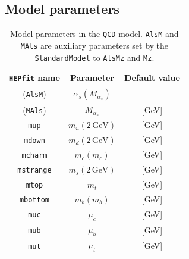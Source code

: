 \documentclass[preprint,3p,12pt]{elsarticle}
\newcommand{\HEPfit}{\texttt{HEPfit}\xspace}
\begin{document}
\begin{appendices}
\noappendicestocpagenum
\addappheadtotoc

\section{Model parameters}
\label{sec:appModelParameters}


\begin{table}[tb]
 \centering
 \caption{Model parameters in the {\tt QCD} model. {\tt AlsM} and {\tt MAls} are auxiliary parameters set by the {\tt StandardModel} to {\tt AlsMz} and {\tt Mz}.}\vspace{0.2cm}
  \begin{tabular}{| c | c | c | }
\hline
\textbf{\HEPfit name}&
\textbf{Parameter}&
\textbf{Default value}\\
%
\hline
({\tt AlsM}) & $\alpha_s(M_{\alpha_s})$ & \\
({\tt MAls}) & $M_{\alpha_s}$ &  [GeV]\\
{\tt mup} & $m_{u}(2\,\mathrm{GeV})$ &  [GeV]\\
{\tt mdown} & $m_{d}(2\,\mathrm{GeV})$ &  [GeV]\\
{\tt mcharm} & $m_{c}(m_c)$ &  [GeV]\\
{\tt mstrange} & $m_{s}(2\,\mathrm{GeV})$ &  [GeV]\\
{\tt mtop} & $m_{t}$ &  [GeV]\\
{\tt mbottom} & $m_{b}(m_b)$ &  [GeV]\\
{\tt muc} & $\mu_c$ &  [GeV]\\
{\tt mub} & $\mu_b$ &  [GeV]\\
{\tt mut} & $\mu_t$ &  [GeV]\\
\hline
  \end{tabular}
 \label{tab:QCDpars}
\end{table} 


\end{appendices}
\end{document}

